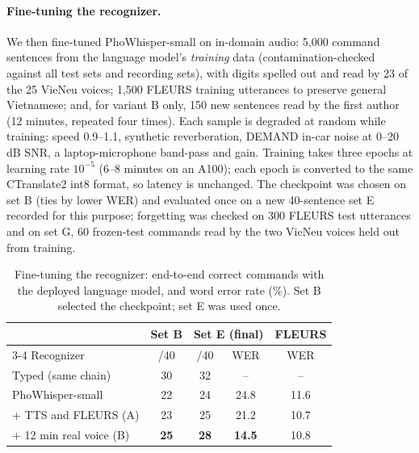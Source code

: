\paragraph{Fine-tuning the recognizer.} We then fine-tuned PhoWhisper-small on in-domain audio: 5,000 command sentences from
the language model's \emph{training} data (contamination-checked against all test sets and recording sets), with digits
spelled out and read by 23 of the 25 VieNeu voices; 1,500 FLEURS training utterances to preserve general Vietnamese; and, for
variant B only, 150 new sentences read by the first author (12 minutes, repeated four times). Each sample is degraded at
random while training: speed 0.9--1.1, synthetic reverberation, DEMAND in-car noise at 0--20\,dB SNR, a laptop-microphone
band-pass and gain. Training takes three epochs at learning rate $10^{-5}$ (6--8 minutes on an A100); each epoch is converted
to the same CTranslate2 int8 format, so latency is unchanged. The checkpoint was chosen on set B (ties by lower WER) and
evaluated once on a new 40-sentence set E recorded for this purpose; forgetting was checked on 300 FLEURS test utterances and on
set G, 60 frozen-test commands read by the two VieNeu voices held out from training.

\begin{table}[t]
\centering\small
\setlength{\tabcolsep}{3.2pt}
\begin{tabular}{@{}lcccc@{}}
\toprule
& Set B & \multicolumn{2}{c}{Set E (final)} & FLEURS \\
\cmidrule(lr){3-4}
Recognizer & /40 & /40 & WER & WER \\
\midrule
Typed (same chain) & 30 & 32 & -- & -- \\
PhoWhisper-small & 22 & 24 & 24.8 & 11.6 \\
\quad + TTS and FLEURS (A) & 23 & 25 & 21.2 & 10.7 \\
\quad + 12 min real voice (B) & \textbf{25} & \textbf{28} & \textbf{14.5} & 10.8 \\
\bottomrule
\end{tabular}
\caption{Fine-tuning the recognizer: end-to-end correct commands with the deployed language model, and word error rate
(\%). Set B selected the checkpoint; set E was used once.}
\label{tab:sttft}
\end{table}

